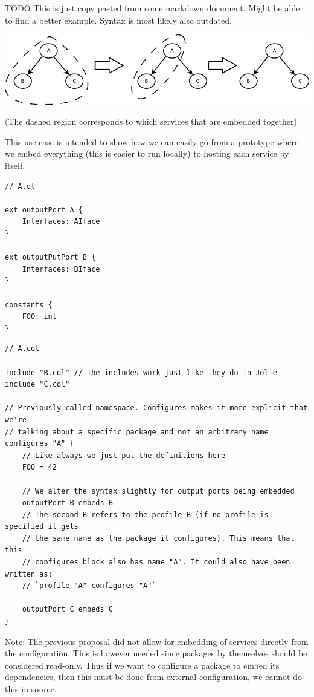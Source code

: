 TODO This is just copy pasted from some markdown document. Might be able to
find a better example. Syntax is most likely also outdated.

\includegraphics[width=\textwidth]{prototypes.png}

(The dashed region corresponds to which services that are embedded together)

This use-case is intended to show how we can easily go from a prototype where
we embed everything (this is easier to run locally) to hosting each service by
itself.

\begin{verbatim}
// A.ol

ext outputPort A {
    Interfaces: AIface
}

ext outputPutPort B {
    Interfaces: BIface
}

constants {
    FOO: int
}
\end{verbatim}

\begin{verbatim}
// A.col

include "B.col" // The includes work just like they do in Jolie
include "C.col"

// Previously called namespace. Configures makes it more explicit that we're
// talking about a specific package and not an arbitrary name
configures "A" {
    // Like always we just put the definitions here
    FOO = 42

    // We alter the syntax slightly for output ports being embedded
    outputPort B embeds B
    // The second B refers to the profile B (if no profile is specified it gets
    // the same name as the package it configures). This means that this
    // configures block also has name "A". It could also have been written as:
    // `profile "A" configures "A"`

    outputPort C embeds C
}
\end{verbatim}

Note: The previous proposal did not allow for embedding of services directly
from the configuration. This is however needed since packages by themselves
should be considered read-only. Thus if we want to configure a package to embed
its dependencies, then this must be done from external configuration, we cannot
do this in source.

